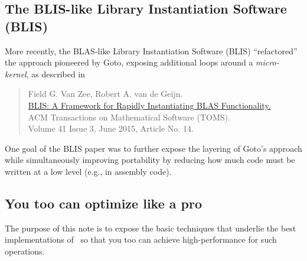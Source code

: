 \subsection{The BLIS-like Library Instantiation Software (BLIS)}

More recently, the BLAS-like Library Instantiation Software (BLIS) ``refactored'' the approach pioneered by Goto, exposing additional loops around a {\em micro-kernel}, as described in
\begin{quote}
	Field G. Van Zee, Robert A. van de Geijn. \\
	\href{http://dl.acm.org/citation.cfm?id=2786970.2764454&coll=DL&dl=GUIDE&CFID=702354034&CFTOKEN=48470379}{%
		BLIS: A Framework for Rapidly Instantiating BLAS Functionality.} \\
	ACM Transactions on Mathematical Software (TOMS).\\
	Volume 41 Issue 3, June 2015,
	Article No. 14.
\end{quote}
One goal of the BLIS paper was to further expose the layering of Goto's approach while simultaneously improving portability by reducing how much code must be written at a low level (e.g., in assembly code).

\subsection{You too can optimize like a pro}

The purpose of this note is to expose the basic techniques that 
underlie the best implementations of \Gemm\ so that you too can achieve high-performance for such operations.

